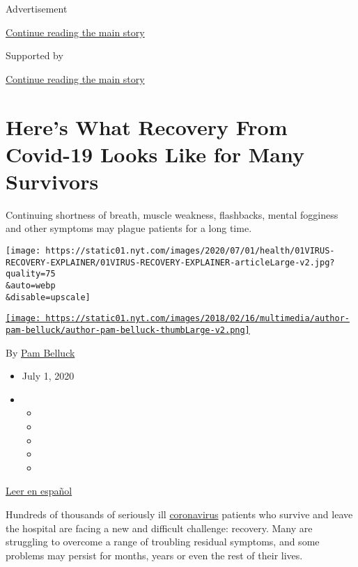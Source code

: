 Advertisement

\protect\hyperlink{after-top}{Continue reading the main story}

Supported by

\protect\hyperlink{after-sponsor}{Continue reading the main story}

\hypertarget{heres-what-recovery-from-covid-19-looks-like-for-many-survivors}{%
\section{Here's What Recovery From Covid-19 Looks Like for Many
Survivors}\label{heres-what-recovery-from-covid-19-looks-like-for-many-survivors}}

Continuing shortness of breath, muscle weakness, flashbacks, mental
fogginess and other symptoms may plague patients for a long time.

\texttt{[image: https://static01.nyt.com/images/2020/07/01/health/01VIRUS-RECOVERY-EXPLAINER/01VIRUS-RECOVERY-EXPLAINER-articleLarge-v2.jpg?quality=75\\\&auto=webp\\\&disable=upscale]}

\href{https://www.nytimes.com/by/pam-belluck}{\texttt{[image: https://static01.nyt.com/images/2018/02/16/multimedia/author-pam-belluck/author-pam-belluck-thumbLarge-v2.png]}}

By \href{https://www.nytimes.com/by/pam-belluck}{Pam Belluck}

\begin{itemize}
\item
  July 1, 2020
\item
  \begin{itemize}
  \item
  \item
  \item
  \item
  \item
  \end{itemize}
\end{itemize}

\href{https://www.nytimes.com/es/2020/07/02/espanol/ciencia-y-tecnologia/sobrevivientes-coronavirus-recuperacion.html}{Leer
en español}

Hundreds of thousands of seriously ill
\href{https://www.nytimes.com/2020/07/22/health/coronavirus-isolation-testing.html}{coronavirus}
patients who survive and leave the hospital are facing a new and
difficult challenge: recovery. Many are struggling to overcome a range
of troubling residual symptoms, and some problems may persist for
months, years or even the rest of their lives.

